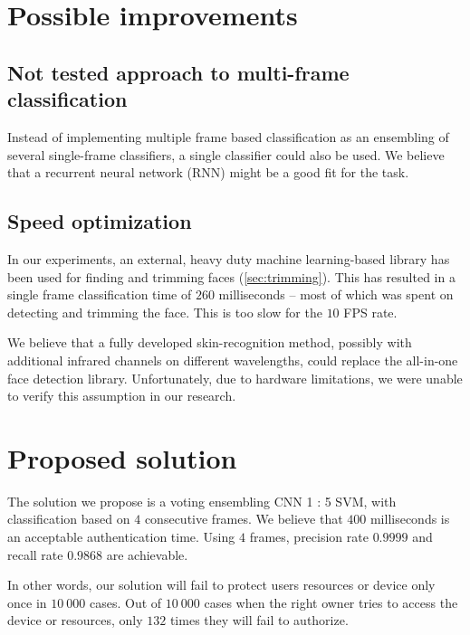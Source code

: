     \section*{Possible improvements}

    \subsection*{Not tested approach to multi-frame classification}
    Instead of implementing multiple frame based classification as an ensembling
    of several single-frame classifiers, a single classifier could also be used.
    We believe that a recurrent neural network (RNN) might be a good fit for the
    task.

    \subsection*{Speed optimization}
    In our experiments, an external, heavy duty machine learning-based library
    has been used for finding and trimming faces (\ref{sec:trimming}). This has
    resulted in a single frame classification time of $260$ milliseconds -- most of
    which was spent on detecting and trimming the face. This is too slow for
    the $10$ FPS rate.

    We believe that a fully developed skin-recognition method, possibly with
    additional infrared channels on different wavelengths, could replace the
    all-in-one face detection library. Unfortunately, due to hardware limitations,
    we were unable to verify this assumption in our research.

    \section{Proposed solution}
    The solution we propose is a voting ensembling CNN 1 : 5 SVM, with
    classification based on $4$ consecutive frames. We believe that $400$ milliseconds
    is an acceptable authentication time. Using $4$ frames, precision rate $0.9999$
    and recall rate $0.9868$ are achievable.

    In other words, our solution will fail to protect users resources or device
    only once in $10\ 000$ cases. Out of $10\ 000$ cases when the right owner
    tries to access the device or resources, only $132$ times they will fail
    to authorize.
